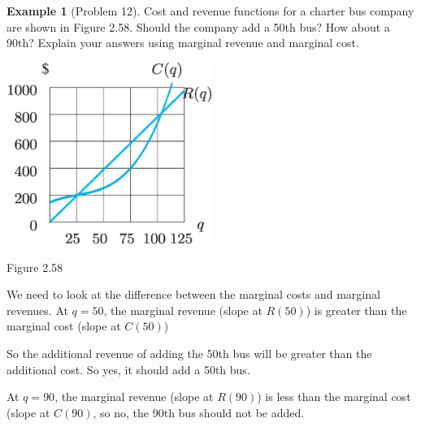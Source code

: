 \documentclass[oneside]{book}
\theoremstyle{definition}
\newtheorem{example}{Example}
\theoremstyle{solution}
\newtheorem*{solution}{Solution}
\newenvironment{solution}{\vspace{2in}\comment}{\endcomment}
\begin{document}
\begin{example}[Problem 12]
  Cost and revenue functions for a charter bus company are shown in
  Figure 2.58. Should the company add a 50th bus? How about a 90th?
  Explain your answers using marginal revenue and marginal cost.
  \begin{center}
\includegraphics[width=0.5\textwidth]{Images/s2-5prob12}

{\Large Figure 2.58}
  \end{center}
\end{example}

\begin{solution}
  We need to look at the difference between the marginal costs and
  marginal revenues.  At $q = 50$, the marginal revenue (slope at
  $R(50)$) is greater than the marginal cost (slope at $C(50)$)
\begin{center}
\end{center}
  So the additional revenue of adding the 50th bus will be greater
  than the additional cost.  So yes, it should add a 50th bus.
    
  At $q = 90$, the marginal revenue (slope at $R(90)$) is less than
  the marginal cost (slope at $C(90)$, so no, the 90th bus should not
  be added.
\end{solution}
\end{document}

